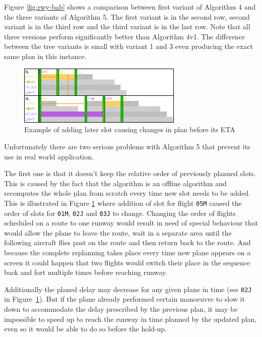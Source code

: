 Figure \ref{fig:rwy-bab} shows a comparison between first variant of Algorithm 4 and the three variants of Algorithm 5. The first variant is in the second row, second variant is in the third row and the third variant is in the last row. Note that all three versions perform significantly better than Algorithm 4v1. The difference between the tree variants is small with variant 1 and 3 even producing the exact same plan in this instance.

\begin{figure}[h]
    \centering
    \includegraphics[width=0.7\textwidth]{figures/rwy-proof.png}
    \caption{Example of adding later slot causing changes in plan before its ETA}
    \label{fig:rwy-proof}
\end{figure}

Unfortunately there are two serious problems with Algorithm 5 that prevent its use in real world application.

The first one is that it doesn't keep the relative order of previously planned slots. This is caused by the fact that the algorithm is an offline algorithm and recomputes the whole plan from scratch every time new slot needs to be added. This is illustrated in Figure \ref{fig:rwy-proof} where addition of slot for flight \texttt{05M} caused the order of slots for \texttt{01M}, \texttt{02J} and \texttt{03J} to change. Changing the order of flights scheduled on a route to one runway would result in need of special behaviour that would allow the plane to leave the route, wait in a separate area until the following aircraft flies past on the route and then return back to the route. And because the complete replanning takes place every time new plane appears on a screen it could happen that two flights would switch their place in the sequence back and fort multiple times before reaching runway.

Additionally the planed delay may decrease for any given plane in time (see \texttt{02J} in Figure~\ref{fig:rwy-proof}). But if the plane already performed certain manoeuvre to slow it down to accommodate the delay prescribed by the previous plan, it may be impossible to speed up to reach the runway in time planned by the updated plan, even so it would be able to do so before the hold-up.

